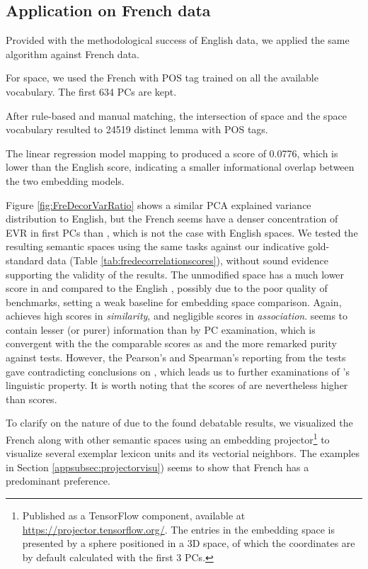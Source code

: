 

\subsection{Application on French data}

Provided with the methodological success of English data, we applied the same algorithm against French data.

For  space, we used the French  with POS tag trained on all the available vocabulary. The first 634 PCs are kept.

After rule-based and manual matching, the intersection of  space and the  space vocabulary resulted to 24519 distinct lemma with POS tags.

The linear regression model mapping  to  produced a  score of 0.0776, which is lower than the English score, indicating a smaller informational overlap between the two embedding models.

Figure \ref{fig:FreDecorVarRatio} shows a similar PCA explained variance distribution to English, but the French  seems have a denser concentration of EVR in first PCs than , which is not the case with English spaces. We tested the resulting semantic spaces using the same tasks against our indicative gold-standard data  (Table \ref{tab:fredecorrelationscores}), without sound evidence supporting the validity of the results. The unmodified  space has a much lower score in \similarity and \association compared to the English , possibly due to the poor quality of benchmarks, setting a weak baseline for embedding space comparison. 
Again,  achieves high scores in \emph{similarity}, and negligible scores in \emph{association}.  seems to contain lesser (or purer) information than  by PC examination, which is convergent with the the comparable \similarity scores as  and the more remarked purity against \association tests. However, the Pearson's and Spearman's  reporting from the tests gave contradicting conclusions on , which leads us to further examinations of 's linguistic property. It is worth noting that the \association scores of  are nevertheless higher than \similarity scores. 



To clarify on the nature of  due to the found debatable results, we visualized the French  along with other semantic spaces using an embedding projector\footnote{Published as a TensorFlow component, available at \url{https://projector.tensorflow.org/}. The entries in the embedding space is presented by a sphere positioned in a 3D space, of which the coordinates are by default calculated with the first 3 PCs.} to visualize several exemplar lexicon units and its vectorial neighbors. The examples in Section \ref{appsubsec:projectorvisu}) seems to show that French  has a predominant \association preference.


